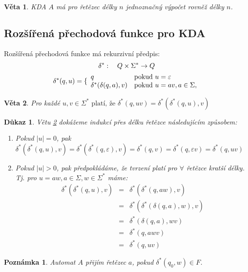 \documentclass[10pt, a4paper, titlepage]{article}
\theoremstyle{note}
\newtheorem{dukaz}{Důkaz}
\newtheorem{veta}{Věta}
\newtheorem{poznamka}{Poznámka}
\begin{document}
\begin{veta}
KDA $A$ má pro řetězec délky $n$ jednoznačný výpočet rovněž délky $n$.
\end{veta}

\subsection{Rozšířená přechodová funkce pro KDA}

Rozšířená přechodová funkce má rekurzivní předpis:
\begin{gather*}
\delta^*:\quad Q \times \Sigma^* \rightarrow Q \\
\delta^*(q, u) = \lbrace
\begin{array}{l l}
q & \text{pokud } u = \varepsilon \\
\delta^*(\delta(q, a), v) & \text{pokud } u = av, a \in \Sigma, 
\end{array}
\end{gather*}

\begin{veta}\label{veta-kdaaa}
Pro každé $u,v \in \Sigma^* \text{ platí, že } \delta^*(q, uv) = \delta^*(\delta^*(q, u), v)$
\end{veta}

\begin{dukaz}
Větu \ref{veta-kdaaa} dokážeme indukcí přes délku řetězce následujícím způsobem:
\begin{enumerate}
\item
Pokud $|u| = 0$, pak $\delta^*(\delta^*(q,u),v) = \delta^*(\delta^*(q, \varepsilon),v) = \delta^*(q,v) = \delta^*(q, \varepsilon v)
= \delta^*(q,uv)$

\item
Pokud $|u| > 0$, pak předpokládáme, že tvrzení platí pro $\forall$ řetězce kratší délky. Tj. pro $u = aw, a \in \Sigma, w \in \Sigma^*$ máme:
\begin{eqnarray*}
\delta^*(\delta^*(q,u),v) &=& \delta^*(\delta^*(q, aw),v) \\
&=& \delta^*(\delta^*(\delta(q,a),w),v) \\
&=& \delta^*(\delta(q,a),wv) \\
&=& \delta^*(q,awv) \\
&=& \delta^*(q,uv)
\end{eqnarray*}
\end{enumerate}
\end{dukaz}

\begin{poznamka}
Automat $A$ přijím řetězec $a$, pokud $\delta^*(q_0,w) \in F$.
\end{poznamka}
\end{document}
